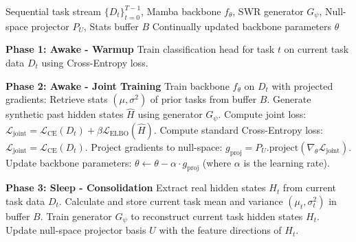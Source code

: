 \begin{algorithm}[H]
\caption{HippoCortex Sleep-Wake Continual Learning Loop}
\label{alg:swr_consolidation}
\begin{algorithmic}[1]
\Require Sequential task stream $\{D_t\}_{t=0}^{T-1}$, Mamba backbone $f_\theta$, SWR generator $G_\psi$, Null-space projector $P_U$, Stats buffer $B$
\Ensure Continually updated backbone parameters $\theta$

    \State \textbf{Phase 1: Awake - Warmup}
    \State Train classification head for task $t$ on current task data $D_t$ using Cross-Entropy loss.
    
    \State \textbf{Phase 2: Awake - Joint Training}
    \State Train backbone $f_\theta$ on $D_t$ with projected gradients:
        \State Retrieve stats $(\mu, \sigma^2)$ of prior tasks from buffer $B$.
        \State Generate synthetic past hidden states $\hat{H}$ using generator $G_\psi$.
        \State Compute joint loss: $\mathcal{L}_{\text{joint}} = \mathcal{L}_{\text{CE}}(D_t) + \beta \mathcal{L}_{\text{ELBO}}(\hat{H})$.
    \Else
        \State Compute standard Cross-Entropy loss: $\mathcal{L}_{\text{joint}} = \mathcal{L}_{\text{CE}}(D_t)$.
    \EndIf
    \State Project gradients to null-space: $g_{\text{proj}} = P_U.\text{project}(\nabla_\theta \mathcal{L}_{\text{joint}})$.
    \State Update backbone parameters: $\theta \leftarrow \theta - \alpha \cdot g_{\text{proj}}$ (where $\alpha$ is the learning rate).

    \State \textbf{Phase 3: Sleep - Consolidation}
    \State Extract real hidden states $H_t$ from current task data $D_t$.
    \State Calculate and store current task mean and variance $(\mu_t, \sigma_t^2)$ in buffer $B$.
    \State Train generator $G_\psi$ to reconstruct current task hidden states $H_t$.
    \State Update null-space projector basis $U$ with the feature directions of $H_t$.
\EndFor
\end{algorithmic}
\end{algorithm}
